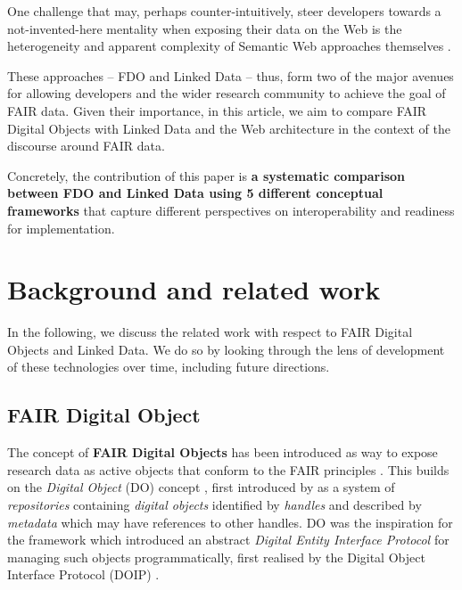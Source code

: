 \documentclass[fleqn,10pt,lineno]{wlpeerjlua}
\begin{document}
One challenge that may, perhaps counter-intuitively, steer developers towards a not-invented-here mentality \autocite{stefiDevelopersMakeUnbiased2015,stefiDevelopReuseTwo2015a} when exposing their data on the Web is the heterogeneity and apparent complexity of Semantic Web approaches themselves \autocite{merono-penuelaWebDataApis2021b}.

These approaches -- FDO and Linked Data -- thus, form two of the major avenues for allowing developers and the wider research community to achieve the goal of FAIR data. Given their importance, in this article, we aim to compare FAIR Digital Objects with Linked Data and the Web architecture in the context of the discourse around FAIR data.

Concretely, the contribution of this paper is {\bf a systematic comparison between FDO and Linked Data using 5 different conceptual frameworks} that capture different perspectives on interoperability and readiness for implementation.

\section*{Background and related work}\label{sec:background}

In the following, we discuss the related work with respect to FAIR Digital Objects and Linked Data. We do so by looking through the lens of development of these technologies over time, including future directions.

\subsection*{FAIR Digital Object}\label{sec:fdo}

The concept of \textbf{FAIR Digital Objects} \autocite{schultesFAIRPrinciplesDigital2019a} has been introduced as way to expose research data as active objects that conform to the FAIR principles \autocite{wilkinsonFAIRGuidingPrinciples2016e}. This builds on the \emph{Digital Object} (DO) concept \autocite{kahnFrameworkDistributedDigital2006b}, first introduced by \textcite{kahnFrameworkDistributedDigital1995a} as a system of \emph{repositories} containing \emph{digital objects} identified by \emph{handles} and described by \emph{metadata} which may have references to other handles. DO was the inspiration for the \textcite{x1255FrameworkDiscovery} framework which introduced an abstract \emph{Digital Entity Interface Protocol} for managing such objects programmatically, first realised by the Digital Object Interface Protocol (DOIP) \autocite{DigitalObjectInterface}.
\end{document}

